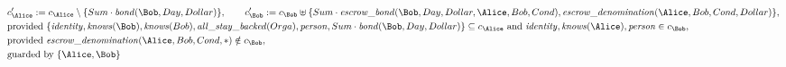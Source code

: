\begin{align*}
&
c'_
{
\Alice
}
 := 
c_
{
\Alice
}
 \setminus 
\{
Sum
\cdot
\mathit{\detokenize{
bond
}}
(
\Bob
,
Day
,
Dollar
)
\}
, \qquad 
c'_
{
\Bob
}
 := 
c_
{
\Bob
}
 \uplus 
\{
Sum
\cdot
\mathit{\detokenize{
escrow_bond
}}
(
\Bob
,
Day
,
Dollar
,
\Alice
,
Bob
,
Cond
)
,
\mathit{\detokenize{
escrow_denomination
}}
(
\Alice
,
Bob
,
Cond
,
Dollar
)
\}
,\\
&
\text{provided } 
\{
\mathit{\detokenize{
identity
}}
,
\mathit{\detokenize{
knows
}}
(
\Bob
)
,
\mathit{\detokenize{
knows
}}
(
Bob
)
,
\mathit{\detokenize{
all_stay_backed
}}
(
Orga
)
,
\mathit{\detokenize{
person
}}
,
Sum
\cdot
\mathit{\detokenize{
bond
}}
(
\Bob
,
Day
,
Dollar
)
\}
 \subseteq c_
{
\Alice
}
 \text{ and } 
\mathit{\detokenize{
identity
}}
,
\mathit{\detokenize{
knows
}}
(
\Alice
)
,
\mathit{\detokenize{
person
}}
 \in c_
{
\Bob
}
,\\
&
\text{provided } 
\mathit{\detokenize{
escrow_denomination
}}
(
\Alice
,
Bob
,
Cond
,
\ast
)
 \notin c_
{
\Bob
}
,\\
&
\text{guarded by } \{
\Alice
,
\Bob
\}
\end{align*}

